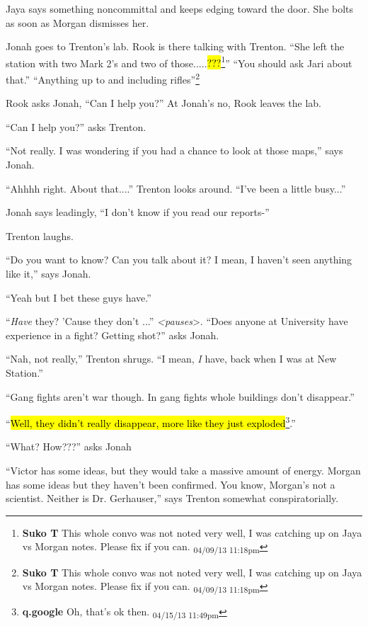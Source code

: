Jaya says something noncommittal and keeps edging toward the door.  She bolts as soon as Morgan dismisses her.



Jonah goes to Trenton's lab.  Rook is there talking with Trenton.  ``She left the station with two Mark 2's and two of those.....\hl{???}\footnote{\textbf{Suko T }This whole convo was not noted very well, I was catching up on Jaya vs Morgan notes.  Please fix if you can. \textsubscript{04/09/13 11:18pm}}''  ``You should ask Jari about that.'' ``Anything up to and including rifles''\footnote{\textbf{Suko T }This whole convo was not noted very well, I was catching up on Jaya vs Morgan notes.  Please fix if you can. \textsubscript{04/09/13 11:18pm}}  

Rook asks Jonah, ``Can I help you?''  At Jonah's no, Rook leaves the lab.

``Can I help you?'' asks Trenton.

``Not really.  I was wondering if you had a chance to look at those maps,'' says Jonah.

``Ahhhh right.  About that....'' Trenton looks around.  ``I've been a little busy...''

Jonah says leadingly, ``I don't know if you read our reports-''

Trenton laughs.  

``Do you want to know?  Can you talk about it?  I mean, I haven't seen anything like it,'' says Jonah.

``Yeah but I bet these guys have.''

``\textit{Have} they?  'Cause they don't ...'' \textit{\textless pauses}\textgreater .  ``Does anyone at University have experience in a fight?  Getting shot?'' asks Jonah.

``Nah, not really,'' Trenton shrugs.  ``I mean, \textit{I} have, back when I was at New Station.''

``Gang fights aren't war though.  In gang fights whole buildings don't disappear.''

``\hl{Well, they didn't really disappear, more like they just exploded}\footnote{\textbf{q.google }Oh, that's ok then. \textsubscript{04/15/13 11:49pm}}.''

``What?  How???'' asks Jonah

``Victor has some ideas, but they would take a massive amount of energy.  Morgan has some ideas but they haven't been confirmed.  You know, Morgan's not a scientist.  Neither is Dr. Gerhauser,'' says Trenton somewhat conspiratorially.

